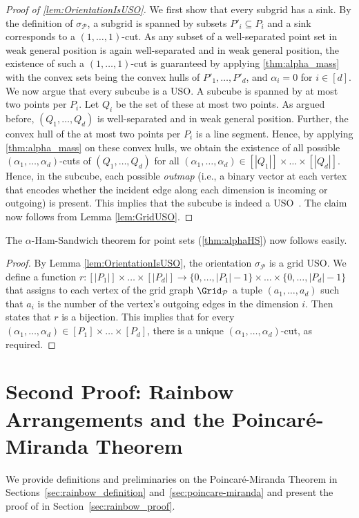 %
\begin{proof}[Proof of \cref{lem:OrientationIsUSO}]
We first show that every subgrid has a sink. 
By the definition of $\sigma_{\mathcal{P}}$, a subgrid is spanned by subsets $P'_i\subseteq P_i$ and a sink corresponds to a $(1,\dots,1)$-cut. 
%
As any subset of a well-separated point set in weak general position is again well-separated and in weak general position, the existence of such a $(1,\dots,1)$-cut is guaranteed by applying \cref{thm:alpha_mass} with the convex sets being the convex hulls of $P'_1, \dots, P'_d$, and $\alpha_i = 0$ for $i \in [d]$.
%
We now argue that every subcube is a USO. 
A subcube is spanned by at most two points per $P_i$. 
Let $Q_i$ be the set of these at most two points.
As argued before, $(Q_1, \dots, Q_d)$ is well-separated and in weak general position.
Further, the convex hull of the at most two points per $P_i$ is a line segment.
Hence, by applying \cref{thm:alpha_mass} on these convex hulls, we obtain the existence of all possible $(\alpha_1, \dots, \alpha_d)$-cuts of $(Q_1, \dots, Q_d)$ for all $(\alpha_1, \dots, \alpha_d) \in [|Q_1|] \times \dots \times [|Q_d|]$.
Hence, in the subcube, each possible \emph{outmap} (i.e., a binary vector at each vertex that encodes whether the incident edge along each dimension is incoming or outgoing) is present.
This implies that the subcube is indeed a USO~\cite{szabo2001usos}.
%
The claim now follows from Lemma \ref{lem:GridUSO}.
\end{proof}
%
The $\alpha$-Ham-Sandwich theorem for point sets (\cref{thm:alphaHS}) now follows easily.
%
\alphaHS*
%
\begin{proof}
By Lemma \ref{lem:OrientationIsUSO}, the orientation $\sigma_{\mathcal{P}}$ is a grid USO. 
We define a function $r : [|P_1|] \times \dots \times [|P_d|] \to \{0, \dots, |P_1|-1\} \times \dots \times \{0, \dots, |P_d|-1\}$ that assigns to each vertex of the grid graph $\Grid_{\mathcal{P}}$ a tuple $(a_1, \dots, a_d)$ such that $a_i$ is the number of the vertex's outgoing edges in the dimension $i$.
Then \cite[Theorem 2.14]{gaertner2008grids} states that $r$ is a bijection.
This implies that for every $(\alpha_1,\ldots,\alpha_d) \in [P_1] \times \dots \times [P_d]$, there is a unique $(\alpha_1,\ldots,\alpha_d)$-cut, as required.
\end{proof}
%
\section{Second Proof: Rainbow Arrangements and the Poincar\'{e}-Miranda Theorem}
\label{sec:rainbow}
%
We provide definitions and preliminaries on the Poincar\'{e}-Miranda Theorem in Sections~\ref{sec:rainbow_definition} and~\ref{sec:poincare-miranda} and present the proof of  in Section~\ref{sec:rainbow_proof}.
%
